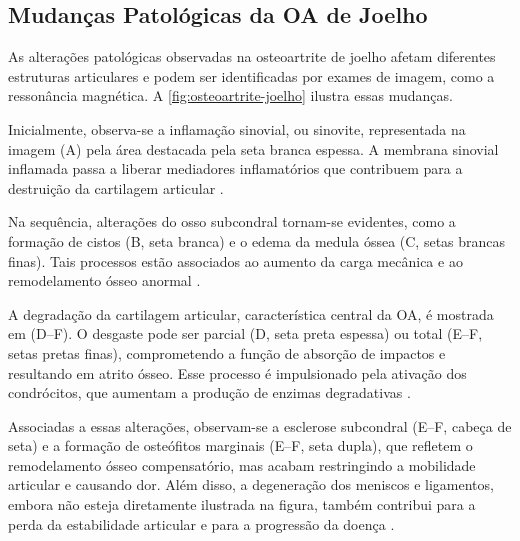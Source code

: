 \subsection{Mudanças Patológicas da OA de Joelho}

As alterações patológicas observadas na osteoartrite de joelho afetam diferentes estruturas articulares e podem ser identificadas por exames de imagem, como a ressonância magnética. A \autoref{fig:osteoartrite-joelho} ilustra essas mudanças.

Inicialmente, observa-se a inflamação sinovial, ou sinovite, representada na imagem (A) pela área destacada pela seta branca espessa. A membrana sinovial inflamada passa a liberar mediadores inflamatórios que contribuem para a destruição da cartilagem articular \cite{Pessler2008}.  

Na sequência, alterações do osso subcondral tornam-se evidentes, como a formação de cistos (B, seta branca) e o edema da medula óssea (C, setas brancas finas). Tais processos estão associados ao aumento da carga mecânica e ao remodelamento ósseo anormal \cite{vanderKraan2007}.  

A degradação da cartilagem articular, característica central da OA, é mostrada em (D–F). O desgaste pode ser parcial (D, seta preta espessa) ou total (E–F, setas pretas finas), comprometendo a função de absorção de impactos e resultando em atrito ósseo. Esse processo é impulsionado pela ativação dos condrócitos, que aumentam a produção de enzimas degradativas \cite{Goldring2009}.  

Associadas a essas alterações, observam-se a esclerose subcondral (E–F, cabeça de seta) e a formação de osteófitos marginais (E–F, seta dupla), que refletem o remodelamento ósseo compensatório, mas acabam restringindo a mobilidade articular e causando dor. Além disso, a degeneração dos meniscos e ligamentos, embora não esteja diretamente ilustrada na figura, também contribui para a perda da estabilidade articular e para a progressão da doença \cite{Loeser2012}.  

